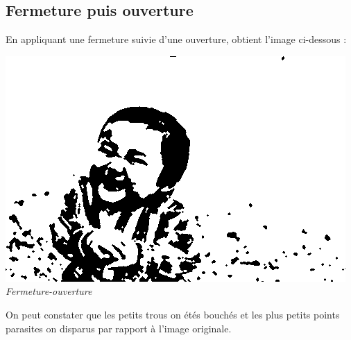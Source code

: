 \documentclass[a4paper,11pt]{article}
\begin{document}
\subsection{Fermeture puis ouverture}
En appliquant une fermeture suivie d'une ouverture, obtient l'image ci-dessous :
\begin{center}
\includegraphics[scale=0.7]{babyfermeouvert.png}\\
\textit{Fermeture-ouverture}
\end{center}
On peut constater que les petits trous on étés bouchés et les plus petits points parasites on disparus par rapport à l'image originale.


\newpage
\end{document}
